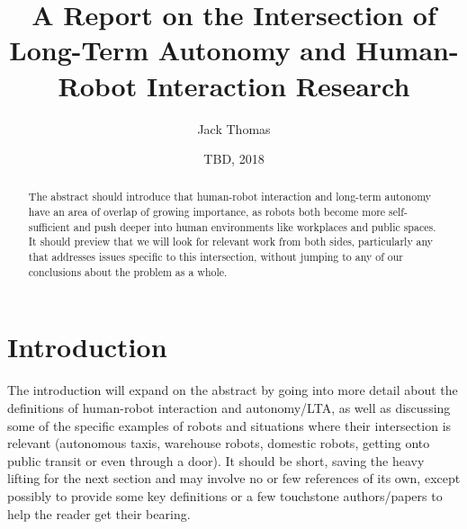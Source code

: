 \documentclass{sfuthesis}
\title{A Report on the Intersection of Long-Term Autonomy and Human-Robot Interaction Research}
\author{Jack Thomas}
\date{TBD, 2018}
\begin{document}
\frontmatter
\maketitle{}
\makecommittee{}


\begin{abstract}
The abstract should introduce that human-robot interaction and long-term autonomy have an area of overlap of growing importance, as robots both become more self-sufficient and push deeper into human environments like workplaces and public spaces. It should preview that we will look for relevant work from both sides, particularly any that addresses issues specific to this intersection, without jumping to any of our conclusions about the problem as a whole.
\end{abstract}





%
\tableofcontents%
\clearpage

%
\listoftables%
\clearpage

%
\listoffigures%
\clearpage





%
%

\mainmatter%

\chapter{Introduction}

The introduction will expand on the abstract by going into more detail about the definitions of human-robot interaction and autonomy/LTA, as well as discussing some of the specific examples of robots and situations where their intersection is relevant (autonomous taxis, warehouse robots, domestic robots, getting onto public transit or even through a door). It should be short, saving the heavy lifting for the next section and may involve no or few references of its own, except possibly to provide some key definitions or a few touchstone authors/papers to help the reader get their bearing.
\end{document}
